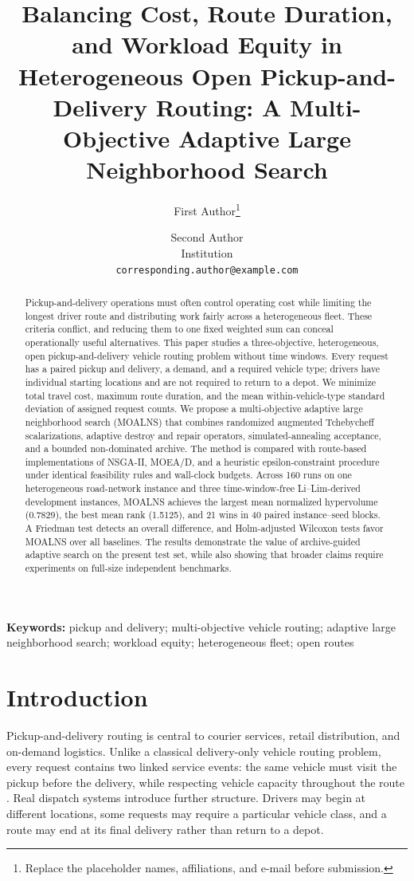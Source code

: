 \documentclass[11pt,a4paper]{article}
\title{Balancing Cost, Route Duration, and Workload Equity in Heterogeneous Open Pickup-and-Delivery Routing: A Multi-Objective Adaptive Large Neighborhood Search}
\author{First Author\thanks{Replace the placeholder names, affiliations, and e-mail before submission.} \and Second Author\\
Institution\\
\texttt{corresponding.author@example.com}}
\date{}
\newcommand{\MOALNS}{MOALNS}
\begin{document}
\maketitle

\begin{abstract}
Pickup-and-delivery operations must often control operating cost while limiting the longest driver route and distributing work fairly across a heterogeneous fleet. These criteria conflict, and reducing them to one fixed weighted sum can conceal operationally useful alternatives. This paper studies a three-objective, heterogeneous, open pickup-and-delivery vehicle routing problem without time windows. Every request has a paired pickup and delivery, a demand, and a required vehicle type; drivers have individual starting locations and are not required to return to a depot. We minimize total travel cost, maximum route duration, and the mean within-vehicle-type standard deviation of assigned request counts. We propose a multi-objective adaptive large neighborhood search (\MOALNS{}) that combines randomized augmented Tchebycheff scalarizations, adaptive destroy and repair operators, simulated-annealing acceptance, and a bounded non-dominated archive. The method is compared with route-based implementations of NSGA-II, MOEA/D, and a heuristic epsilon-constraint procedure under identical feasibility rules and wall-clock budgets. Across 160 runs on one heterogeneous road-network instance and three time-window-free Li--Lim-derived development instances, \MOALNS{} achieves the largest mean normalized hypervolume (0.7829), the best mean rank (1.5125), and 21 wins in 40 paired instance--seed blocks. A Friedman test detects an overall difference, and Holm-adjusted Wilcoxon tests favor \MOALNS{} over all baselines. The results demonstrate the value of archive-guided adaptive search on the present test set, while also showing that broader claims require experiments on full-size independent benchmarks.
\end{abstract}

\noindent\textbf{Keywords:} pickup and delivery; multi-objective vehicle routing; adaptive large neighborhood search; workload equity; heterogeneous fleet; open routes

\section{Introduction}

Pickup-and-delivery routing is central to courier services, retail distribution, and on-demand logistics. Unlike a classical delivery-only vehicle routing problem, every request contains two linked service events: the same vehicle must visit the pickup before the delivery, while respecting vehicle capacity throughout the route \cite{savelsbergh1995general}. Real dispatch systems introduce further structure. Drivers may begin at different locations, some requests may require a particular vehicle class, and a route may end at its final delivery rather than return to a depot.
\end{document}
